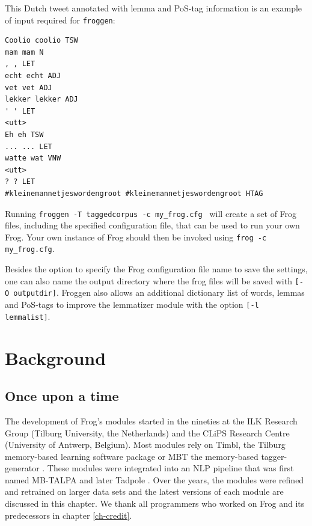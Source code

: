 \documentclass{book}
\begin{document}
This Dutch tweet annotated with lemma and PoS-tag information is an example of input required for {\tt froggen}:

\begin{verbatim}
Coolio coolio TSW
mam mam N
, , LET
echt echt ADJ
vet vet ADJ
lekker lekker ADJ
' ' LET
<utt>
Eh eh TSW
... ... LET
watte wat VNW
<utt>
? ? LET
#kleinemannetjeswordengroot #kleinemannetjeswordengroot HTAG
\end{verbatim}

Running {\tt froggen -T taggedcorpus -c my\_frog.cfg } will create a set of
Frog files, including the specified configuration file, that can be used to run
your own Frog. Your own instance of Frog should then be invoked using {\tt frog -c my\_frog.cfg}.

Besides the option to specify the Frog configuration file name to save the settings, one can also name the output directory where the frog files will be saved with {\tt [-O outputdir]}.
Froggen also allows an additional dictionary list of words, lemmas and PoS-tags
to improve the lemmatizer module with the option {\tt [-l lemmalist]}.


\chapter{Background}\label{ch-bg}

\section{Once upon a time }

The development of Frog's modules started in the nineties at the ILK Research Group
(Tilburg University, the Netherlands) and the CLiPS Research Centre (University
of Antwerp, Belgium). Most modules rely on Timbl, the Tilburg memory-based learning software
package \cite{timbl} or MBT the memory-based tagger-generator \cite{mbt}.
These modules were integrated into an NLP pipeline that was first named MB-TALPA and later Tadpole \cite{Tadpole}. Over the years, the modules were refined and retrained on larger data sets and the latest versions of each module are discussed in this chapter. We thank all programmers who worked on Frog and its predecessors in chapter \ref{ch-credit}.
\end{document}
